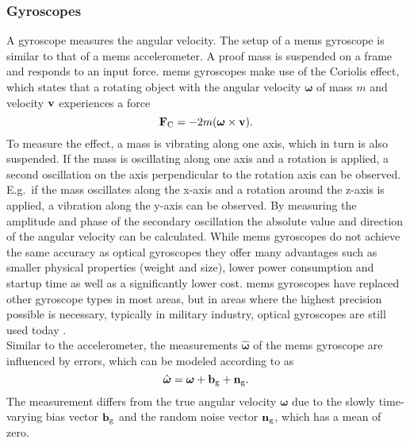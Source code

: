 \subsubsection{ Gyroscopes}
A gyroscope measures the angular velocity.
The setup of a \gls{mems} gyroscope is similar to that of a \gls{mems} accelerometer.
A proof mass is suspended on a frame and responds to an input force.
\gls{mems} gyroscopes make use of the Coriolis effect, which states that a rotating object with the angular velocity $\boldsymbol{\omega}$ of mass $m$ and velocity $\vb{v}$ experiences a force
\begin{equation}
	\vb{F}_\mathrm{C}  = -2m(\boldsymbol{\omega}\times \vb{v}).
\end{equation}
To measure the effect, a mass is vibrating along one axis, which in turn is also suspended.
If the mass is oscillating along one axis and a rotation is applied, a second oscillation on the axis perpendicular to the rotation axis can be observed.
E.g.\ if the mass oscillates along the x-axis and a rotation around the z-axis is applied, a vibration along the y-axis can be observed.
By measuring the amplitude and phase of the secondary oscillation the absolute value and direction of the angular velocity can be calculated.
While \gls{mems} gyroscopes do not achieve the same accuracy as optical gyroscopes they offer many advantages such as smaller physical properties (weight and size), lower power consumption and startup time as well as a significantly lower cost.
\gls{mems} gyroscopes have replaced other gyroscope types in most areas, but in areas where the highest precision possible is necessary, typically in military industry, optical gyroscopes are still used today \cite{Perlmutter2016}.\\
Similar to the accelerometer, the measurements $\hat{\boldsymbol{\omega}}$ of the \gls{mems} gyroscope are influenced by errors, which can be modeled according to \cite{Lefferts1982} as
\begin{equation}
	\hat{\boldsymbol{\omega}} = \boldsymbol{\omega} + \vb{b}_\mathrm{g} + \vb{n}_\mathrm{g}.
\end{equation}
The measurement differs from the true angular velocity $\boldsymbol{\omega}$ due to the slowly time-varying bias vector $\vb{b}_\mathrm{g}$ and the random noise vector $\vb{n}_\mathrm{g}$, which has a mean of zero.


